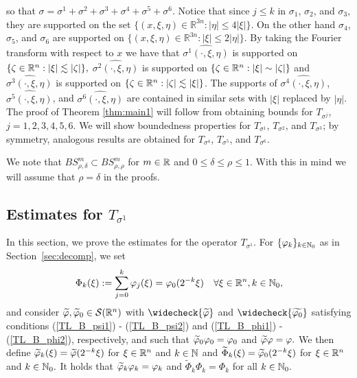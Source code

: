 so that $\sigma = \sigma^1+\sigma^2+\sigma^3+\sigma^4+\sigma^5+\sigma^6.$ Notice that since $j\leq k$ in $\sigma_1$, $\sigma_2$, and $\sigma_3$, they are supported on the set $\{(x,\xi,\eta) \in \mathbb{R}^{3n} : |\eta| \leq 4|\xi|\}$. On the other hand $\sigma_4$, $\sigma_5$, and $\sigma_6$ are supported on $\{(x,\xi,\eta) \in \mathbb{R}^{3n} : |\xi| \leq 2|\eta|\}$. By taking the Fourier transform with respect to $x$ we have that $\widehat{\sigma^1(\cdot,\xi,\eta)}$ is supported on $\{\zeta\in{{\mathbb R}^n}: \left\vert \xi \right\vert\lesssim \left\vert \zeta \right\vert\},$
$\widehat{\sigma^2(\cdot,\xi,\eta)}$ is supported on $\{\zeta\in{{\mathbb R}^n}: \left\vert \xi \right\vert\sim \left\vert \zeta \right\vert\}$ and $\widehat{\sigma^3(\cdot,\xi,\eta)}$ is supported on $\{\zeta\in{{\mathbb R}^n}: \left\vert \zeta \right\vert\lesssim \left\vert \xi \right\vert\}$. The supports of $\widehat{\sigma^4(\cdot,\xi,\eta)}$, $\widehat{\sigma^5(\cdot,\xi,\eta)}$, and $\widehat{\sigma^6(\cdot,\xi,\eta)}$ are contained in similar sets with $|\xi|$ replaced by $|\eta|$. The proof of Theorem \ref{thm:main1} will follow from obtaining bounds for $T_{\sigma^j}$, $j=1,2,3,4,5,6$. We will show boundedness properties for $T_{\sigma^1}$, $T_{\sigma^2}$, and $T_{\sigma^3}$; by symmetry, analogous results are obtained for $T_{\sigma^4}$, $T_{\sigma^5}$, and $T_{\sigma^6}$.

We note that $BS^m_{\rho,\delta}\subset BS^m_{\rho,\rho}$ for $m\in\mathbb{R}$ and $0\le \delta\le \rho\le 1$. With this in mind we will assume that $\rho = \delta$ in the proofs.

\subsection{Estimates for $T_{\sigma^1}$}\label{sec:T1}
In this section, we prove the estimates for the operator $T_{{\sigma}^1}$. For $\{\varphi_k\}_{k\in\mathbb{N}_0}$ as in Section~\ref{sec:decomp}, we set
\begin{equation*}
\Phi_k(\xi):= \sum_{j=0}^k \varphi_j(\xi)=\varphi_0(2^{-k}\xi)\quad \forall \xi\in{{\mathbb R}^n}, k\in\mathbb{N}_0,
\end{equation*}
and consider $\widetilde{\varphi},\widetilde{\varphi}_0\in{\mathcal{S}}({{\mathbb R}^n})$ with $\widecheck{\widetilde{\f}}$ and $\widecheck{\widetilde{\f_0}}$ satisfying conditions (\ref{TL_B_psi1}) - (\ref{TL_B_psi2}) and (\ref{TL_B_phi1})  - (\ref{TL_B_phi2}), respectively, and such that $\widetilde{\varphi}_0\varphi_0=\varphi_0$ and $\widetilde{\varphi}\varphi=\varphi.$ We then define $\widetilde{\varphi}_k(\xi)=\widetilde{\varphi}(2^{-k}\xi)$ for $\xi\in{{\mathbb R}^n}$ and $k\in\mathbb{N}$ and $\widetilde{\Phi}_k(\xi)=\widetilde{\varphi}_0(2^{-k}\xi)$ for $\xi\in{{\mathbb R}^n}$ and $k\in\mathbb{N}_0.$ It holds that $\widetilde{\varphi}_k \varphi_k = \varphi_k$ and $\widetilde{\Phi}_k \Phi_k = \Phi_k$ for all $k\in\mathbb{N}_0.$

